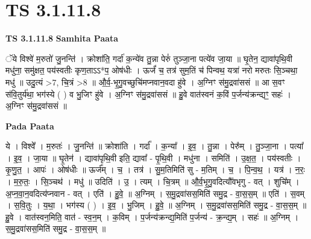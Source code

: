 \documentclass[17pt]{extarticle}
\begin{document}
\section*{ TS 3.1.11.8 }

\textbf{TS 3.1.11.8 } \newline
\textbf{Samhita Paata} \newline

ॅये विश्वे॑ म॒रुतो॑ जु॒नन्ति॑ । क्रोशा॑ति॒ गर्दा॑ क॒न्ये॑व तु॒न्ना पेरुं॑ तुञ्जा॒ना पत्ये॑व जा॒या ॥ घृ॒तेन॒ द्यावा॑पृथि॒वी मधु॑ना॒ समु॑क्षत॒ पय॑स्वतीः कृण॒ताऽऽ*प॒ ओष॑धीः । ऊर्जं॑ च॒ तत्र॑ सुम॒तिं च॑ पिन्वथ॒ यत्रा॑ नरो मरुतः सि॒ञ्चथा॒ मधु॑ ॥ उदु॒त्यं >7, चि॒त्रं >8 ॥ औ॒र्व॒-भृ॒गु॒वच्छुचि॑मप्नवान॒वदा हु॑वे । अ॒ग्निꣳ स॑मु॒द्रवा॑ससं ॥ आ स॒वꣳ स॑वि॒तुर्य॑था॒ भग॑स्ये ( ) व भु॒जिꣳ हु॑वे । अ॒ग्निꣳ स॑मु॒द्रवा॑ससं ॥ हु॒वे वात॑स्वनं क॒विं प॒र्जन्य॑क्रन्द्यꣳ॒॒ सहः॑ । अ॒ग्निꣳ स॑मु॒द्रवा॑ससं ॥ \newline

\textbf{Pada Paata} \newline

ये । विश्वे᳚ । म॒रुतः॑ । जु॒नन्ति॑ ॥ क्रोशा॑ति । गर्दा᳚ । क॒न्या᳚ । इ॒व॒ । तु॒न्ना । पेरु᳚म् । तु॒ञ्जा॒ना । पत्या᳚ । इ॒व॒ । जा॒या ॥ घृ॒तेन॑ । द्यावा॑पृथि॒वी इति॒ द्यावा᳚ - पृ॒थि॒वी । मधु॑ना । समिति॑ । उ॒क्ष॒त॒ । पय॑स्वतीः । कृ॒णु॒त॒ । आपः॑ । ओष॑धीः ॥ ऊर्ज᳚म् । च॒ । तत्र॑ । सु॒म॒तिमिति॑ सु - म॒तिम् । च॒ । पि॒न्व॒थ॒ । यत्र॑ । न॒रः॒ । म॒रु॒तः॒ । सि॒ञ्चथ॑ । मधु॑ ॥ उदिति॑ । उ॒ । त्यम् । चि॒त्रम् ॥ औ॒र्व॒भृ॒गु॒वदित्यौ᳚वभृगु - वत् । शुचि᳚म् । अ॒प्न॒वा॒न॒वदित्य॑प्नवान - वत् । एति॑ । हु॒वे॒ ॥ अ॒ग्निम् । स॒मु॒द्रवा॑सस॒मिति॑ समु॒द्र - वा॒स॒स॒म् ॥ एति॑ । स॒वम् । स॒वि॒तुः । य॒था॒ । भग॑स्य ( ) । इ॒व॒ । भु॒जिम् । हु॒वे॒ ॥ अ॒ग्निम् । स॒मु॒द्रवा॑सस॒मिति॑ समु॒द्र - वा॒स॒स॒म् ॥ हु॒वे । वात॑स्वन॒मिति॒ वात॑ - स्व॒न॒म् । क॒विम् । प॒र्जन्य॑क्रन्द्य॒मिति॑ प॒र्जन्य॑ - क्र॒न्द्य॒म् । सहः॑ ॥ अ॒ग्निम् । स॒मु॒द्रवा॑सस॒मिति॑ समु॒द्र - वा॒स॒स॒म् ॥  \newline
\end{document}
